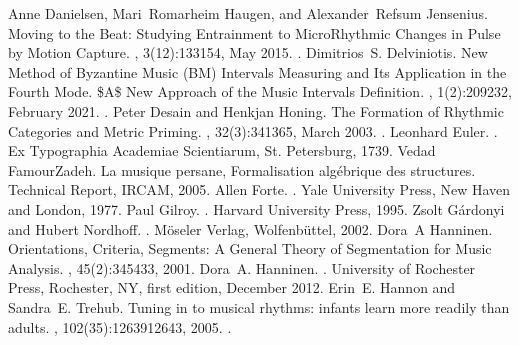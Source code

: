 \documentclass[letterpaper,10pt,english]{sphinxmanual}
\begin{document}
\begin{sphinxthebibliography}{10}
\sphinxAtStartPar
Anne Danielsen, Mari Romarheim Haugen, and Alexander Refsum Jensenius. Moving to the Beat: Studying Entrainment to Micro\sphinxhyphen{}Rhythmic Changes in Pulse by Motion Capture. , 3(1\sphinxhyphen{}2):133\textendash{}154, May 2015. .
\sphinxAtStartPar
Dimitrios S. Delviniotis. New Method of Byzantine Music (BM) Intervals\textquotesingle{} Measuring and Its Application in the Fourth Mode. \$A\$ New Approach of the Music Intervals\textquotesingle{} Definition. , 1(2):209\textendash{}232, February 2021. .
\sphinxAtStartPar
Peter Desain and Henkjan Honing. The Formation of Rhythmic Categories and Metric Priming. , 32(3):341\textendash{}365, March 2003. .
\sphinxAtStartPar
Leonhard Euler. . Ex Typographia Academiae Scientiarum, St. Petersburg, 1739.
\sphinxAtStartPar
Vedad FamourZadeh. La musique persane, Formalisation algébrique des structures. Technical Report, IRCAM, 2005.
\sphinxAtStartPar
Allen Forte. . Yale University Press, New Haven and London, 1977.
\sphinxAtStartPar
Paul Gilroy. . Harvard University Press, 1995.
\sphinxAtStartPar
Zsolt Gárdonyi and Hubert Nordhoff. . Möseler Verlag, Wolfenbüttel, 2002.
\sphinxAtStartPar
Dora A Hanninen. Orientations, Criteria, Segments: A General Theory of Segmentation for Music Analysis. , 45(2):345\textendash{}433, 2001.
\sphinxAtStartPar
Dora A. Hanninen. . University of Rochester Press, Rochester, NY, first edition, December 2012.
\sphinxAtStartPar
Erin E. Hannon and Sandra E. Trehub. Tuning in to musical rhythms: infants learn more readily than adults. , 102(35):12639\textendash{}12643, 2005. .

\end{sphinxthebibliography}
\end{document}

